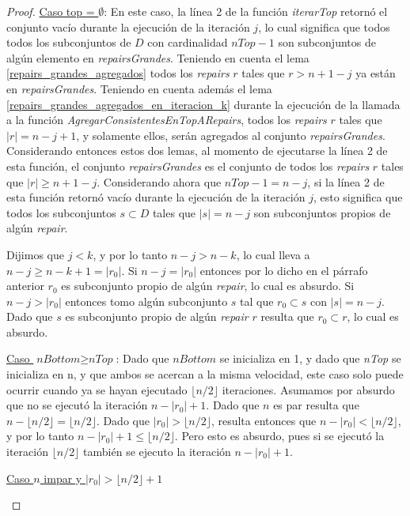 \documentclass[11pt,a4paper,twoside]{tesis}
\newcommand{\parteEntera}{\lfloor n/2 \rfloor}
\begin{document}
\begin{proof}
\underline{Caso top = $\emptyset$}: En este caso, la línea 2 de la función \textit{iterarTop} retornó el conjunto vacío durante la ejecución de la iteración $j$, lo cual significa que todos todos los subconjuntos de $D$ con cardinalidad $nTop - 1$ son subconjuntos de algún elemento en \textit{repairsGrandes}. Teniendo en cuenta el lema \ref{repairs_grandes_agregados} todos los \textit{repairs} $r$ tales que $r > n + 1 - j$ ya están en \textit{repairsGrandes}. Teniendo en cuenta además el lema \ref{repairs_grandes_agregados_en_iteracion_k} durante la ejecución de la llamada a la función \textit{AgregarConsistentesEnTopARepairs}, todos los \textit{repairs} $r$ tales que $|r| = n - j + 1$, y solamente ellos, serán agregados al conjunto \textit{repairsGrandes}. Considerando entonces estos dos lemas, al momento de ejecutarse la línea 2 de esta función, el conjunto \textit{repairsGrandes} es el conjunto de todos los \textit{repairs} $r$ tales que $|r|\geq n + 1 - j$. Considerando ahora que $nTop - 1 = n -j$, si la línea 2 de esta función retornó vacío durante la ejecución de la iteración $j$, esto significa que todos los subconjuntos $s \subset D$ tales que $|s| = n - j$ son subconjuntos propios de algún \textit{repair}. 



Dijimos que $j < k$, y por lo tanto $n - j > n - k$, lo cual lleva a $n - j \geq n - k + 1 =|r_{0}|$. Si $n - j = |r_{0}|$ entonces por lo dicho en el párrafo anterior $r_0$ es subconjunto propio de algún \textit{repair}, lo cual es absurdo. Si $n - j > |r_0|$ entonces tomo algún subconjunto $s$ tal que $r_0 \subset s$ con $|s| = n - j$. Dado que $s$ es subconjunto propio de algún \textit{repair} $r$ resulta que $r_0 \subset r$, lo cual es absurdo.

\underline{Caso $\textit{nBottom} \geq \textit{nTop}$}: Dado que $\textit{nBottom}$ se inicializa en 1, y dado que \textit{nTop} se inicializa en n, y que ambos se acercan a la misma velocidad, este caso solo puede ocurrir cuando ya se hayan ejecutado $\parteEntera$ iteraciones. Asumamos por absurdo que no se ejecutó la iteración $n - |r_0| + 1$. Dado que $n$ es par resulta que $n - \parteEntera = \parteEntera$. Dado que $|r_0| > \parteEntera$, resulta entonces que $n - |r_0| < \parteEntera$, y por lo tanto $n - |r_0| + 1 \leq \parteEntera$. Pero esto es absurdo, pues si se ejecutó la iteración $\parteEntera$ también se ejecuto la iteración $n - |r_0| + 1$.

\begin{center}
\underline{Caso $n$ impar y $|r_0| > \parteEntera + 1$}
 \end{center}



\end{proof}
\end{document}
